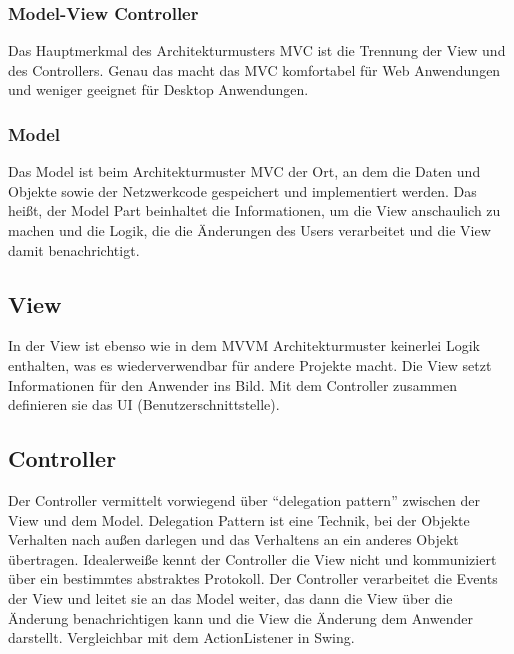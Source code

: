 \setcounter{secnumdepth}{3}
\subsubsection{Model-View Controller}
Das Hauptmerkmal des Architekturmusters \ac{MVC} ist die Trennung der View und des Controllers. Genau das macht das MVC komfortabel f\"ur Web Anwendungen und weniger geeignet f\"ur Desktop Anwendungen\cite{Syromiatnikov2014}.

\subsubsection*{Model}
Das Model ist beim Architekturmuster \ac{MVC} der Ort, an dem die Daten und Objekte sowie der Netzwerkcode gespeichert und implementiert werden. Das hei\ss{}t, der Model Part beinhaltet die Informationen, um die View anschaulich zu machen und die Logik, die die \"Anderungen des Users verarbeitet und die View damit benachrichtigt\cite{Leff2001}.
\subsection*{View}
In der View ist ebenso wie in dem \ac{MVVM} Architekturmuster keinerlei Logik enthalten, was es wiederverwendbar f\"ur andere Projekte macht.\cite{Peres2016} Die View setzt Informationen f\"ur den Anwender ins Bild. Mit dem Controller zusammen definieren sie das \ac{UI} (Benutzerschnittstelle)\cite{Leff2001}.
\subsection*{Controller}
Der Controller vermittelt vorwiegend \"uber \enquote{delegation pattern} zwischen der View und dem Model. Delegation Pattern ist eine Technik, bei der Objekte Verhalten nach au\ss{}en darlegen und das Verhaltens an ein anderes Objekt \"ubertragen\cite{TU-Wien2013}. Idealerwei\ss{}e kennt der Controller die View nicht und kommuniziert \"uber ein bestimmtes abstraktes Protokoll\cite{Peres2016}.
Der Controller verarbeitet die Events der View und leitet sie an das Model weiter, das dann die View \"uber die \"Anderung benachrichtigen kann und die View die \"Anderung dem Anwender darstellt. Vergleichbar mit dem ActionListener in Swing\cite{Singer2004}.
